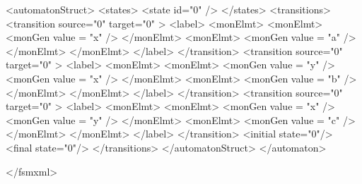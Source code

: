 {\footnotesize 
\begin{listingcont}
  <automatonStruct>
    <states>
      <state  id="0" />
    </states>
    <transitions>
      <transition  source="0"  target="0" >
        <label>
	  <monElmt>
	    <monElmt>
	      <monGen  value = "x" />
	    </monElmt>
	    <monElmt>
	      <monGen  value = "a" />
	    </monElmt>
	  </monElmt>
        </label>
      </transition>
      <transition  source="0"  target="0" >
        <label>
	  <monElmt>
	    <monElmt>
	      <monGen  value = "y" />
	      <monGen  value = "x" />
	    </monElmt>
	    <monElmt>
	      <monGen  value = "b" />
	    </monElmt>
	  </monElmt>
        </label>
      </transition>
      <transition  source="0"  target="0" >
        <label>
	  <monElmt>
	    <monElmt>
	      <monGen  value = "x" />
	      <monGen  value = "y" />
	    </monElmt>
	    <monElmt>
	      <monGen  value = "c" />
	    </monElmt>
	  </monElmt>
        </label>
      </transition>
      <initial state="0"/>
      <final   state="0"/>
    </transitions>
  </automatonStruct>
</automaton>

</fsmxml>
\end{listingcont}
}

\clearpage

